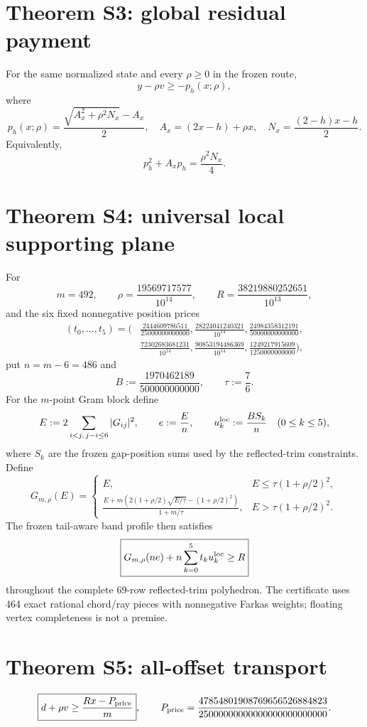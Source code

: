 \documentclass[11pt]{article}
\begin{document}
\section*{Theorem S3: global residual payment}
For the same normalized state and every $\rho\ge0$ in the frozen route,
\[
y-\rho v\ge-p_h(x;\rho),
\]
where
\[
p_h(x;\rho)=\frac{\sqrt{A_x^2+\rho^2N_x}-A_x}{2},\quad
A_x=(2x-h)+\rho x,\quad
N_x=\frac{(2-h)x-h}{2}.
\]
Equivalently,
\[
p_h^2+A_xp_h=\frac{\rho^2N_x}{4}.
\]

\section*{Theorem S4: universal local supporting plane}
For
\[
m=492,\qquad \rho=\frac{19569717577}{10^{14}},\qquad
R=\frac{38219880252651}{10^{13}},
\]
and the six fixed nonnegative position prices
\[
\begin{aligned}
(t_0,\ldots,t_5)=\biggl(&\frac{2444609786511}{25000000000000},
\frac{28224041240321}{10^{14}},
\frac{24984358312191}{50000000000000},\\
&\frac{72302683681231}{10^{14}},
\frac{90853194486369}{10^{14}},
\frac{1249217915609}{1250000000000}\biggr),
\end{aligned}
\]
put $n=m-6=486$ and
\[
B:=\frac{1970462189}{500000000000},\qquad \tau:=\frac76.
\]
For the $m$-point Gram block define
\[
E:=2\sum_{i<j,\,j-i\le6}|G_{ij}|^2,\qquad e:=\frac En,
\qquad u_k^{\rm loc}:=\frac{B S_k}{n}\quad(0\le k\le5),
\]
where $S_k$ are the frozen gap-position sums used by the reflected-trim constraints. Define
\[
G_{m,\rho}(E)=
\begin{cases}
E,&E\le\tau(1+\rho/2)^2,\\
\displaystyle\frac{E+m\left(2(1+\rho/2)\sqrt{E/\tau}-(1+\rho/2)^2\right)}
{1+m/\tau},&E>\tau(1+\rho/2)^2.
\end{cases}
\]
The frozen tail-aware band profile then satisfies
\[
\boxed{
G_{m,\rho}(ne)+n\sum_{k=0}^5t_k u_k^{\rm loc}\ge R
}
\]
throughout the complete 69-row reflected-trim polyhedron.
The certificate uses 464 exact rational chord/ray pieces with nonnegative Farkas weights;
floating vertex completeness is not a premise.

\section*{Theorem S5: all-offset transport}
\[
\boxed{
d+\rho v\ge\frac{Rx-P_{\rm price}}{m}
},
\qquad
P_{\rm price}=
\frac{47854801908769656526884823}{25000000000000000000000000}.
\]
\end{document}
